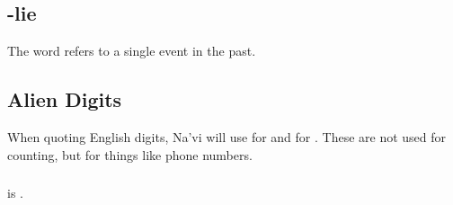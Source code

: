 \subsection{-lie} The word  refers to a single event
in the past. 

\subsection{Alien Digits} When quoting English digits, Na'vi will use
 for  and  for .  These are not used
for counting, but for things like phone numbers.

\subsubsection{}  is .  
